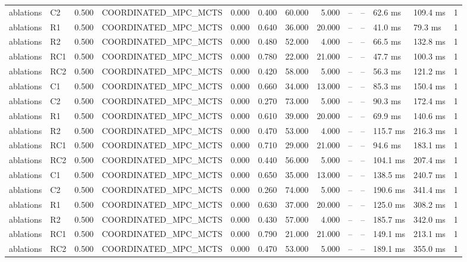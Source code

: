 \begin{table}
{\begin{tabular}{llrlrrrrrrllr}
ablations & C2 & 0.500 & COORDINATED\_MPC\_MCTS & 0.000 & 0.400 & 60.000 & 5.000 & -- & -- & 62.6 ms & 109.4 ms & 1 \\
ablations & R1 & 0.500 & COORDINATED\_MPC\_MCTS & 0.000 & 0.640 & 36.000 & 20.000 & -- & -- & 41.0 ms & 79.3 ms & 1 \\
ablations & R2 & 0.500 & COORDINATED\_MPC\_MCTS & 0.000 & 0.480 & 52.000 & 4.000 & -- & -- & 66.5 ms & 132.8 ms & 1 \\
ablations & RC1 & 0.500 & COORDINATED\_MPC\_MCTS & 0.000 & 0.780 & 22.000 & 21.000 & -- & -- & 47.7 ms & 100.3 ms & 1 \\
ablations & RC2 & 0.500 & COORDINATED\_MPC\_MCTS & 0.000 & 0.420 & 58.000 & 5.000 & -- & -- & 56.3 ms & 121.2 ms & 1 \\
ablations & C1 & 0.500 & COORDINATED\_MPC\_MCTS & 0.000 & 0.660 & 34.000 & 13.000 & -- & -- & 85.3 ms & 150.4 ms & 1 \\
ablations & C2 & 0.500 & COORDINATED\_MPC\_MCTS & 0.000 & 0.270 & 73.000 & 5.000 & -- & -- & 90.3 ms & 172.4 ms & 1 \\
ablations & R1 & 0.500 & COORDINATED\_MPC\_MCTS & 0.000 & 0.610 & 39.000 & 20.000 & -- & -- & 69.9 ms & 140.6 ms & 1 \\
ablations & R2 & 0.500 & COORDINATED\_MPC\_MCTS & 0.000 & 0.470 & 53.000 & 4.000 & -- & -- & 115.7 ms & 216.3 ms & 1 \\
ablations & RC1 & 0.500 & COORDINATED\_MPC\_MCTS & 0.000 & 0.710 & 29.000 & 21.000 & -- & -- & 94.6 ms & 183.1 ms & 1 \\
ablations & RC2 & 0.500 & COORDINATED\_MPC\_MCTS & 0.000 & 0.440 & 56.000 & 5.000 & -- & -- & 104.1 ms & 207.4 ms & 1 \\
ablations & C1 & 0.500 & COORDINATED\_MPC\_MCTS & 0.000 & 0.650 & 35.000 & 13.000 & -- & -- & 138.5 ms & 240.7 ms & 1 \\
ablations & C2 & 0.500 & COORDINATED\_MPC\_MCTS & 0.000 & 0.260 & 74.000 & 5.000 & -- & -- & 190.6 ms & 341.4 ms & 1 \\
ablations & R1 & 0.500 & COORDINATED\_MPC\_MCTS & 0.000 & 0.630 & 37.000 & 20.000 & -- & -- & 125.0 ms & 308.2 ms & 1 \\
ablations & R2 & 0.500 & COORDINATED\_MPC\_MCTS & 0.000 & 0.430 & 57.000 & 4.000 & -- & -- & 185.7 ms & 342.0 ms & 1 \\
ablations & RC1 & 0.500 & COORDINATED\_MPC\_MCTS & 0.000 & 0.790 & 21.000 & 21.000 & -- & -- & 149.1 ms & 213.1 ms & 1 \\
ablations & RC2 & 0.500 & COORDINATED\_MPC\_MCTS & 0.000 & 0.470 & 53.000 & 5.000 & -- & -- & 189.1 ms & 355.0 ms & 1 \\

\end{tabular}}
\end{table}
